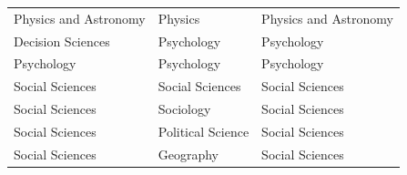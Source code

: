\begin{table}
\begin{tabular}{lll}
Physics and Astronomy & Physics & Physics and Astronomy \\
Decision Sciences & Psychology & Psychology \\
Psychology & Psychology & Psychology \\
Social Sciences & Social Sciences & Social Sciences \\
Social Sciences & Sociology & Social Sciences \\
Social Sciences & Political Science & Social Sciences \\
Social Sciences & Geography & Social Sciences \\
\bottomrule
\end{tabular}
\end{table}
